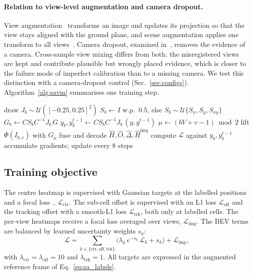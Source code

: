\documentclass[10pt,twocolumn,letterpaper]{article}
\newcommand{\Hhat}{\hat{H}}
\newcommand{\Ohat}{\hat{O}}
\newcommand{\Dhat}{\hat{\Delta}}
\begin{document}
\paragraph{Relation to view-level augmentation and camera dropout.}
View augmentation~\cite{engilberge2023mvaug} transforms an image and updates its projection so that the view stays
aligned with the ground plane, and scene augmentation applies one transform to all views~\cite{engilberge2023mvaug}.
Camera dropout, examined in~\cite{harley2023simplebev}, removes the evidence of a camera. Cross-sample view mixing
differs from both: the misregistered views are kept and contribute plausible but wrongly placed evidence, which is
closer to the failure mode of imperfect calibration than to a missing camera. We test this distinction with a
camera-dropout control (Sec.~\ref{sec:configs}). Algorithm~\ref{alg:savm} summarises one training step.

\begin{algorithm}[t]
\caption{One SA-VM training step (batch $B = 2$)}
\label{alg:savm}
\begin{algorithmic}[1]
  \State draw $J_b \sim \mathcal{U}([-0.25, 0.25]^2)$
  \State $S_b \gets I$ w.p.\ $0.5$, else $S_b \sim \mathcal{U}\{S_x, S_y, S_{xy}\}$
  \State $G_b \gets C S_b C^{-1} J_b\, G$ 
  \State $y_b, y_b^{t-1} \gets C S_b C^{-1} J_b\, (y, y^{t-1})$ 
\EndFor
{}
  \State $\mu \gets (bV + v - 1) \bmod 2$
  \State lift $\Phi(I_{b,v})$ with $G_\mu$ 
\EndFor
\State fuse and decode $\Hhat, \Ohat, \Dhat, \Hhat^{\mathrm{img}}$ 
\State compute $\mathcal{L}$ against $y_b, y_b^{t-1}$ 
\State accumulate gradients; update every 8 steps
\end{algorithmic}
\end{algorithm}

\subsection{Training objective}
\label{sec:loss}

The centre heatmap is supervised with Gaussian targets at the labelled positions and a focal
loss~\cite{lin2017focal}, $\mathcal{L}_{\mathrm{ctr}}$. The sub-cell offset is supervised with an L1 loss
$\mathcal{L}_{\mathrm{off}}$ and the tracking offset with a smooth-L1 loss $\mathcal{L}_{\mathrm{trk}}$, both only at
labelled cells. The per-view heatmaps receive a focal loss averaged over views, $\mathcal{L}_{\mathrm{img}}$. The BEV
terms are balanced by learned uncertainty weights $s_k$:
\begin{equation}
  \mathcal{L} = \sum_{k \in \{\mathrm{ctr}, \mathrm{off}, \mathrm{trk}\}}
  \big(\lambda_k\, e^{-s_k}\, \mathcal{L}_k + s_k\big) + \mathcal{L}_{\mathrm{img}},
  \label{eq:loss}
\end{equation}
with $\lambda_{\mathrm{ctr}} = \lambda_{\mathrm{off}} = 10$ and $\lambda_{\mathrm{trk}} = 1$. All targets are
expressed in the augmented reference frame of Eq.~\eqref{eq:sa_labels}.
\end{document}
